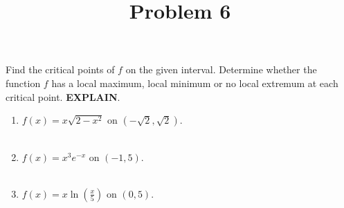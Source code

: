 \documentclass{ximera}
\title[Problem 6]{Problem 6}
\begin{document}
\begin{abstract} \end{abstract}
\maketitle

\begin{problem}
Find the critical points of $f$ on the given interval. Determine whether the function $f$ has a local maximum, local minimum or no local extremum at each critical point. \textbf{EXPLAIN}.
		\begin{enumerate}
		
			\item  $f(x) = x \sqrt{2-x^2}$ on $( -\sqrt{2}, \sqrt{2} )$. \\ \\
			\item  $f(x) = x^3 e^{-x}$ on $(-1,5)$. \\ \\
			\item  $f(x) = x \ln \left( \frac{x}{5} \right)$ on $(0, 5)$.
			\end{enumerate}

\end{problem}
\end{document}
